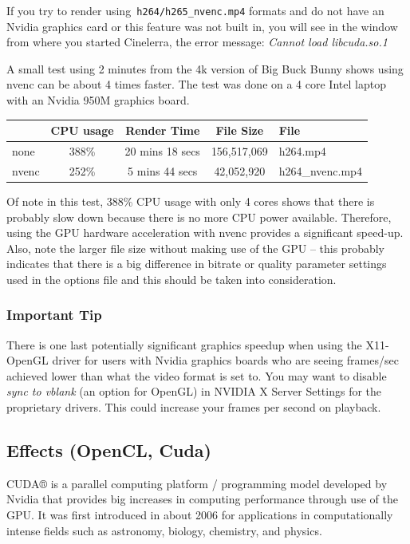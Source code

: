 If you try to render using\texttt{ h264/h265\_nvenc.mp4} formats and do not have an Nvidia graphics card or this feature was not built in, you will see in the window from where you started Cinelerra, the error message: \qquad \textit{Cannot load libcuda.so.1}

A small test using 2 minutes from the 4k version of Big Buck Bunny shows using nvenc can be about 4 times faster.  The test was done on a 4 core Intel laptop with an Nvidia 950M graphics board.

\begin{center}
	\begin{tabular}{l|cccl}
		&CPU usage & Render Time & File Size & File \\
		\hline
		none & 388\% &20 mins 18 secs & 156,517,069 & h264.mp4 \\
		nvenc & 252\% & 5 mins 44 secs & 42,052,920 & h264\_nvenc.mp4 \\
	\end{tabular}
\end{center}

Of note in this test, 388\% CPU usage with only 4 cores shows that there is probably slow down because there is no more CPU power available. Therefore, using the GPU hardware acceleration with nvenc provides a significant speed-up.  Also, note the larger file size without making use of the GPU – this probably indicates that there is a big difference in bitrate or quality parameter settings used in the options file and this should be taken into consideration.

\subsubsection*{Important Tip}%
\label{ssub:important_tip}

There is one last potentially significant graphics speedup when using the X11-OpenGL driver for users with Nvidia graphics boards who are seeing frames/sec achieved lower than what the video format is set to.  You may want to disable \textit{sync to vblank} (an option for OpenGL) in NVIDIA X Server Settings for the proprietary drivers.  This could increase your frames per second on playback.

\subsection{Effects (OpenCL, Cuda)}%
\label{sub:effects_opencl_cuda}

CUDA® is a parallel computing platform / programming model developed by Nvidia that provides big increases in computing performance through use of the GPU. It was first introduced in about 2006 for applications in computationally intense fields such as astronomy, biology, chemistry, and physics.

